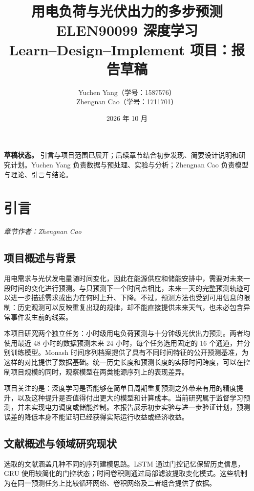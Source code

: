 \documentclass[12pt,a4paper,UTF8]{ctexart}
\title{\textbf{用电负荷与光伏出力的多步预测}\protect\\[8pt]
\large ELEN90099 深度学习\protect\\Learn--Design--Implement 项目：报告草稿}
\author{Yuchen Yang（学号：1587576）\protect\\Zhengnan Cao（学号：1711701）}
\date{2026 年 10 月}
\newcommand{\sectionauthor}[1]{\noindent\textit{章节作者：#1}\par\vspace{3pt}}
\begin{document}
\hypersetup{pageanchor=false}
\begin{titlepage}
\maketitle\thispagestyle{empty}
\vfill
\begin{center}\begin{minipage}{0.85\textwidth}
\textbf{草稿状态。} 引言与项目范围已展开；后续章节结合初步发现、简要设计说明和研究计划。Yuchen Yang 负责数据与预处理、实验与分析；Zhengnan Cao 负责模型与理论、引言与结论。
\end{minipage}\end{center}
\end{titlepage}
\hypersetup{pageanchor=true}
\tableofcontents\clearpage{}

\section{引言}\label{sec:introduction}
\sectionauthor{Zhengnan Cao}
\subsection{项目概述与背景}
用电需求与光伏发电量随时间变化，因此在能源供应和储能安排中，需要对未来一段时间的变化进行预测。与只预测下一个时间点相比，未来一天的完整预测轨迹可以进一步描述需求或出力在何时上升、下降。不过，预测方法也受到可用信息的限制：历史观测可以反映重复出现的规律，却不能直接提供未来天气，也未必包含异常事件发生前的线索。

本项目研究两个独立任务：小时级用电负荷预测与十分钟级光伏出力预测。两者均使用最近 48 小时的数据预测未来 24 小时，每个任务选用固定的 16 个通道，并分别训练模型。Monash 时间序列档案提供了具有不同时间特征的公开预测基准，为这样的对比提供了数据基础\cite{monash}。统一历史长度和预测长度的实际时间跨度，可以在控制项目规模的同时，观察模型在两类能源序列上的表现差异。

项目关注的是：深度学习是否能够在简单日周期重复预测之外带来有用的精度提升，以及这种提升是否值得付出更大的模型和计算成本。当前研究属于监督学习预测，并未实现电力调度或储能控制。本报告展示初步实验与进一步验证计划，预测误差的降低本身不能证明已经获得实际运行收益或经济收益。

\subsection{文献概述与领域研究现状}
选取的文献涵盖几种不同的序列建模思路。LSTM 通过门控记忆保留历史信息，GRU 使用较简化的门控状态\cite{lstm,gru}；时间卷积则通过局部滤波提取变化模式。这些机制为在同一预测任务上比较循环网络、卷积网络及二者组合提供了依据。
\end{document}
